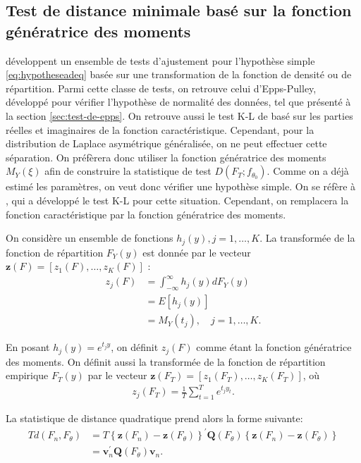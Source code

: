 \subsection{Test de distance minimale basé sur la fonction génératrice
  des moments}
\label{sec:test-de-distance}

\cite{luong1987minimum} développent un ensemble de tests d'ajustement
pour l'hypothèse simple \eqref{eq:hypotheseadeq} basée sur une
transformation de la fonction de densité ou de répartition. Parmi
cette classe de tests, on retrouve celui d’Epps-Pulley, développé pour
vérifier l'hypothèse de normalité des données, tel que présenté à la
section \ref{sec:test-de-epps}. On retrouve aussi le test K-L de
\cite{feuerverger1981efficiency} basé sur les parties réelles et
imaginaires de la fonction caractéristique. Cependant, pour la
distribution de Laplace asymétrique généralisée, on ne peut effectuer
cette séparation. On préfèrera donc utiliser la fonction génératrice
des moments $M_Y(\xi)$ afin de construire la statistique de test
$D(F_T;f_{\theta_0})$. Comme on a déjà estimé les paramètres, on veut donc
vérifier une hypothèse simple. On se réfère à
\cite{KOUTROUVELIS01011980}, qui a développé le test K-L pour cette
situation. Cependant, on remplacera la fonction caractéristique par la
fonction génératrice des moments.

On considère un ensemble de fonctions $h_j(y), j=1,\ldots,K$. La
transformée de la fonction de répartition $F_Y(y)$ est donnée par le
vecteur $\mathbf{z}(F)=[z_1(F),\ldots,z_K(F)]$ :
\begin{align}
  \label{eq:4}
  z_j(F) &= \int_{-\infty}^{\infty} h_j(y) dF_Y(y)\nonumber\\
  &= E[h_j(y)]\nonumber\\
  &= M_Y(t_j),\quad j=1,\ldots,K.
\end{align}

En posant $h_j(y)=e^{t_j y}$, on définit $z_j(F)$ comme étant la
fonction génératrice des moments. On définit aussi la transformée de
la fonction de répartition empirique $F_T(y)$ par le vecteur
$\mathbf{z}(F_T)=[z_1(F_T),\ldots,z_K(F_T)]$, où
\begin{align}
  \label{eq:5}
  z_j(F_T) = \frac{1}{T} \sum_{t=1}^T e^{t_j y_t}.
\end{align}

La statistique de distance quadratique prend alors la forme suivante:
\begin{align}
  \label{eq:9}
  Td(F_n,F_\theta) &= T\left\{\mathbf{z}(F_n)-\mathbf{z}(F_\theta)
  \right\}^{\prime} \mathbf{Q}(F_\theta)
  \left\{\mathbf{z}(F_n)-\mathbf{z}(F_\theta) \right\} \nonumber\\
  &= \mathbf{v}_n^{\prime }\mathbf{Q}(F_\theta)\mathbf{v}_n.
\end{align}

